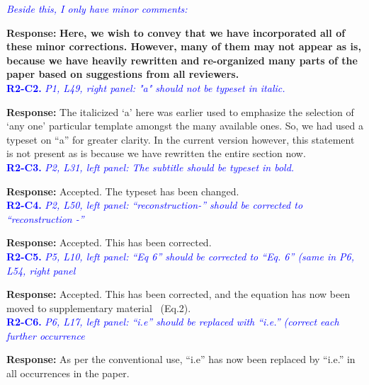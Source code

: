 \documentclass{article}
\begin{document}
\textcolor{blue}{\textit{Beside this, I only have minor comments:}}

\textbf{Response:}\textbf{ Here, we wish to convey that we have incorporated all of these minor corrections. However, many of them may not appear as is, because we have heavily rewritten and re-organized many parts of the paper based on  suggestions from all reviewers.}\\

\textcolor{blue}{\textbf{R2-C2.}\textit{ P1, L49, right panel: "a" should not be typeset in italic.}}

\textbf{Response:} The italicized `a' here was earlier used to emphasize the selection of `any one' particular template amongst the many available ones. So, we had used a typeset on ``a'' for greater clarity. In the current version however, this statement is not present as is because we have rewritten the entire section now.\\%

\textcolor{blue}{\textbf{R2-C3.}\textit{ P2, L31, left panel: The subtitle should be typeset in bold.}}

 \textbf{Response:} Accepted. The typeset has been changed.\\

\textcolor{blue}{\textbf{R2-C4.}\textit{ P2, L50, left panel: ``reconstruction-'' should be corrected to ``reconstruction -''}}

 \textbf{Response:} Accepted. This has been corrected.\\

\textcolor{blue}{\textbf{R2-C5.}\textit{ P5, L10, left panel: ``Eq 6'' should be corrected to ``Eq. 6'' (same in P6, L54, right panel}}

 \textbf{Response:} Accepted. This has been corrected, and the equation has now been moved to  supplementary material~\cite{supp_paper} (Eq.2). \\

\textcolor{blue}{\textbf{R2-C6.}\textit{ P6, L17, left panel: ``i.e'' should be replaced with ``i.e.'' (correct each further occurrence}}

 \textbf{Response:} As per the conventional use, ``i.e'' has now been replaced by ``i.e.'' in all occurrences in the paper.\\
\end{document}
